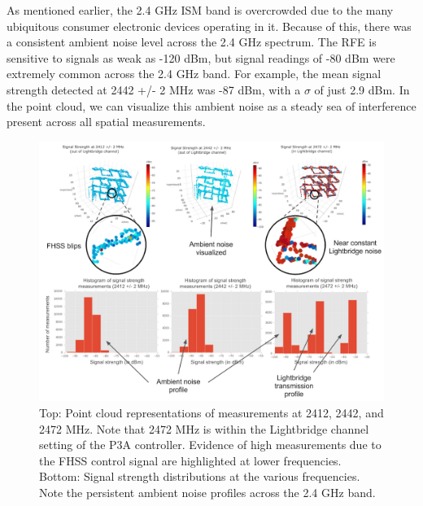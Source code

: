 \documentclass[pageno]{jpaper}
\begin{document}
As mentioned earlier, the 2.4 GHz ISM band is overcrowded due to the many ubiquitous consumer electronic devices operating in it. Because of this, there was a consistent ambient noise level across the 2.4 GHz spectrum. The RFE is sensitive to signals as weak as -120 dBm, but signal readings of -80 dBm were extremely common across the 2.4 GHz band. For example, the mean signal strength detected at 2442 +/- 2 MHz was -87 dBm, with a $\sigma$ of just 2.9 dBm. In the point cloud, we can visualize this ambient noise as a steady sea of interference present across all spatial measurements.

\begin{figure}
	\caption{Top: Point cloud representations of measurements at 2412, 2442, and 2472 MHz. Note that 2472 MHz is within the Lightbridge channel setting of the P3A controller. Evidence of high measurements due to the FHSS control signal are highlighted at lower frequencies. Bottom: Signal strength distributions at the various frequencies. Note the persistent ambient noise profiles across the 2.4 GHz band. }
	\centerline{\includegraphics{PoC_2}}
\end{figure}
\end{document}
